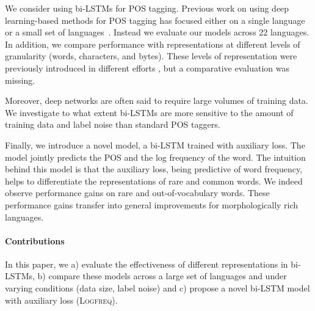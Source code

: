 \documentclass[11pt]{article}
\begin{document}

We consider using bi-LSTMs for POS tagging. Previous work on using deep learning-based methods for POS tagging has focused either on a single language~\cite{Collobert:ea:2011natural,wang:ea:2015:arxiv} or a small set of languages~\cite{ling:ea:2015,santos:zadrozny:2014}. Instead we evaluate our models across 22 languages.
In addition, we compare performance with representations at different levels of granularity (words, characters, and bytes). 
These levels of representation were previously introduced 
in different efforts \cite{chrupala:2013,zhang:ea:2015:char,ling:ea:2015,santos:zadrozny:2014,gillick:ea:2016,kim2015character}, but a comparative evaluation was missing.

Moreover, deep networks are often said to require large volumes of training data. We investigate to what extent bi-LSTMs are more sensitive to the amount of training data and label noise than 
standard POS taggers.

Finally, we introduce a novel model, a bi-LSTM trained with auxiliary loss. The model jointly predicts the POS and the log frequency of 
the word. The intuition behind this model is that the auxiliary loss, being predictive of word frequency, helps to differentiate the representations of rare and common words.
We indeed observe performance gains on rare and out-of-vocabulary words. These performance gains transfer into general improvements for morphologically rich languages. 

\paragraph{Contributions} In this paper, we a) evaluate the effectiveness of different representations in bi-LSTMs, 
b) compare these models across a large set of languages and under varying conditions (data size, label noise) and
c) propose a novel bi-LSTM model with auxiliary loss (\textsc{Logfreq}). %
\end{document}
